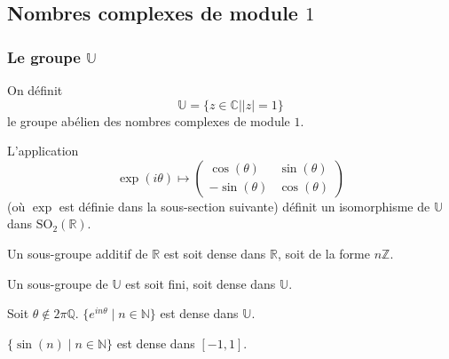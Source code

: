 




  \subsection{Nombres complexes de module \texorpdfstring{$1$}{1}}

  \subsubsection{Le groupe \texorpdfstring{$\mathbb{U}$}{U}}


  \begin{definition}
    On définit
    \[ \mathbb{U} = \{ z \in \mathbb{C} \mid \vert z \vert = 1 \} \]
    le groupe abélien des nombres complexes de module $1$.
  \end{definition}

  \begin{proposition}
    L'application
    \[ \exp(i\theta) \mapsto
      \begin{pmatrix}
        \cos(\theta) & \sin(\theta) \\
        -\sin(\theta) & \cos(\theta)
      \end{pmatrix}
    \]
    (où $\exp$ est définie dans la sous-section suivante) définit un isomorphisme de $\mathbb{U}$ dans $\mathrm{SO}_2(\mathbb{R})$.
  \end{proposition}


  \begin{proposition}
    Un sous-groupe additif de $\mathbb{R}$ est soit dense dans $\mathbb{R}$, soit de la forme $n\mathbb{Z}$.
  \end{proposition}

  \begin{corollary}
    Un sous-groupe de $\mathbb{U}$ est soit fini, soit dense dans $\mathbb{U}$.
  \end{corollary}

  \begin{corollary}
    Soit $\theta \notin 2\pi\mathbb{Q}$. $\{ e^{in\theta} \mid n \in \mathbb{N} \}$ est dense dans $\mathbb{U}$.
  \end{corollary}

  \begin{application}
    $\{ \sin(n) \mid n \in \mathbb{N} \}$ est dense dans $[-1,1]$.
  \end{application}

